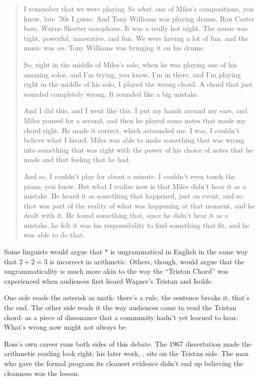 \begin{quote}
    I remember that we were playing \textit{So what}, one of Miles's compositions, you know, late '50s I guess. And Tony Williams was playing drums, Ron Carter bass, Wayne Shorter saxophone. It was a really hot night. The music was tight, powerful, innovative, and fun. We were having a lot of fun, and the music was \textit{on}. Tony Williams was bringing it on his drums.
    
    So, right in the middle of Miles's solo, when he was playing one of his amazing solos, and I'm trying, you know, I'm in there, and I'm playing right in the middle of his solo, I played the wrong chord. A chord that just sounded completely wrong. It sounded like a big mistake. 
    
    And I did this, and I went like this. I put my hands around my ears, and Miles paused for a second, and then he played some notes that made my chord right. He made it correct, which astounded me. I was, I couldn't believe what I heard. Miles was able to make something that was wrong into something that was right with the power of his choice of notes that he made and that feeling that he had. 
    
    And so, I couldn't play for about a minute. I couldn't even touch the piano, you know. But what I realize now is that Miles didn't hear it as a mistake. He heard it as something that happened, just an event, and so that was part of the reality of what was happening at that moment, and he dealt with it. He found something that, since he didn't hear it as a mistake, he felt it was his responsibility to find something that fit, and he was able to do that.
\end{quote}

Some linguists would argue that * is ungrammatical in English in the same way that $2+2=3$ is incorrect in arithmetic. Others, though, would argue that the ungrammaticality is much more akin to the way the \enquote{Tristan Chord} was experienced when audiences first heard Wagner's Tristan and Isolde.

One side reads the asterisk as math: there's a rule, the sentence breaks it, that's the end. The other side reads it the way audiences came to read the Tristan chord: as a piece of dissonance that a community hadn't yet learned to hear. What's wrong now might not always be.

Ross's own career runs both sides of this debate. The 1967 dissertation made the arithmetic reading look right; his later work, , sits on the Tristan side. The man who gave the formal program its cleanest evidence didn't end up believing the cleanness was the lesson.

